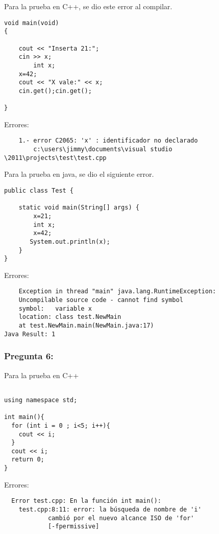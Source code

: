 \documentclass[11pt]{article}
\begin{document}
Para la prueba en C++, se dio este error al compilar.


\begin{lstlisting}[frame=single]
void main(void)
{
	
	cout << "Inserta 21:";
	cin >> x;
        int x;
	x=42;
	cout << "X vale:" << x;
	cin.get();cin.get();
	
}
\end{lstlisting}

\noindent Errores:

\begin{verbatim}
	1.-	error C2065: 'x' : identificador no declarado 
		c:\users\jimmy\documents\visual studio \2011\projects\test\test.cpp
\end{verbatim}

Para la prueba en java, se dio el siguiente error.

\begin{lstlisting}[frame=single]
public class Test {

    static void main(String[] args) {
        x=21;
        int x;
        x=42;
       System.out.println(x);
    }
}
\end{lstlisting}

\noindent Errores:

\begin{verbatim}
	Exception in thread "main" java.lang.RuntimeException: 
	Uncompilable source code - cannot find symbol
 	symbol:   variable x
	location: class test.NewMain
	at test.NewMain.main(NewMain.java:17)
Java Result: 1

\end{verbatim}



\subsubsection{Pregunta 6:}
Para la prueba en C++
\begin{lstlisting}[frame=single]

using namespace std;

int main(){
  for (int i = 0 ; i<5; i++){
    cout << i;
  }
  cout << i; 
  return 0;
}
\end{lstlisting}
\noindent Errores:
\begin{verbatim}
  Error test.cpp: En la función int main():
	test.cpp:8:11: error: la búsqueda de nombre de 'i'
			cambió por el nuevo alcance ISO de 'for'
			[-fpermissive]
\end{verbatim}
\end{document}
